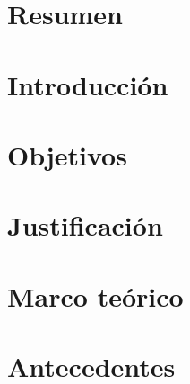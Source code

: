 \documentclass[10pt, letterpaper]{report}
\newcommand{\defaultparformat}[1]{
	{\setlength{\parskip}{2ex}
    }
}
\begin{document}
	\chapter*{Resumen}
	\ifdefined\parpordefecto
		\defaultparformat{resumen}
	\else
		
	\fi
\fi

\ifdefined\CAPintroduccion
	\newpage
	\setcounter{page}{1}
	\chapter{Introducción}
	\ifdefined\parpordefecto
		\defaultparformat{introduccion}
	\else
		
	\fi
\fi

\ifdefined\CAPobjetivos
	\newpage
	\chapter{Objetivos}
	\ifdefined\parpordefecto
		\defaultparformat{objetivos}
	\else
		
	\fi
\fi

\ifdefined\CAPjustificacion
	\newpage
	\chapter{Justificación}
	\ifdefined\parpordefecto
		\defaultparformat{justificacion}
	\else
		
	\fi
\fi

\ifdefined\CAPmarcoteorico
	\newpage
	\chapter{Marco teórico}
	\ifdefined\parpordefecto
		\defaultparformat{marco_teorico}
	\else
		
	\fi
\fi

\ifdefined\CAPantecedentes
	\newpage
	\chapter{Antecedentes}
	\ifdefined\parpordefecto
    	\defaultparformat{antecedentes}
    \else
    	
    \fi  
\fi
\end{document}
